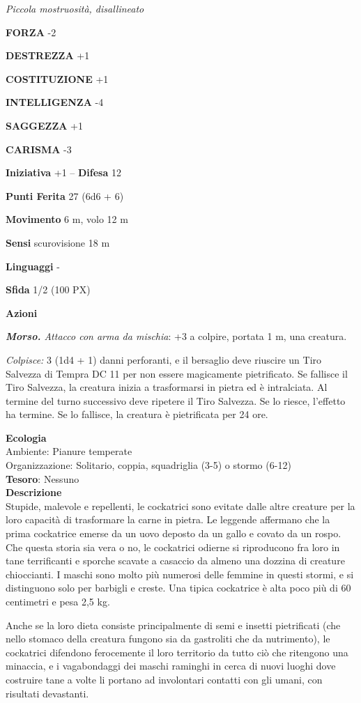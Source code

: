 \begin{multicols}{2}
\textit{Piccola mostruosità, disallineato}

\textbf{FORZA} -2

\textbf{DESTREZZA} +1

\textbf{COSTITUZIONE} +1

\textbf{INTELLIGENZA} -4

\textbf{SAGGEZZA} +1

\textbf{CARISMA} -3

\textbf{Iniziativa} +1 -- \textbf{Difesa} 12

\textbf{Punti Ferita} 27 (6d6 + 6)

\textbf{Movimento} 6 m, volo 12 m

\textbf{Sensi} scurovisione 18 m

\textbf{Linguaggi} -

\textbf{Sfida} 1/2 (100 PX)

\textbf{Azioni}

\textit{\textbf{Morso.} Attacco con arma da mischia}: +3 a colpire, portata 1 m, una creatura.

\textit{Colpisce:} 3 (1d4 + 1) danni perforanti, e il bersaglio deve riuscire un Tiro Salvezza di Tempra DC 11 per non essere magicamente pietrificato. Se fallisce il Tiro Salvezza, la creatura inizia a trasformarsi in pietra ed è intralciata. Al termine del turno successivo deve ripetere il Tiro Salvezza. Se lo riesce, l'effetto ha termine. Se lo fallisce, la creatura è pietrificata per 24 ore.

\textbf{Ecologia}\\
Ambiente: Pianure temperate\\
Organizzazione: Solitario, coppia, squadriglia (3-5) o stormo (6-12)\\
\textbf{Tesoro}: Nessuno\\
\textbf{Descrizione}\\
Stupide, malevole e repellenti, le cockatrici sono evitate dalle altre creature per la loro capacità di trasformare la carne in pietra. Le leggende affermano che la prima cockatrice emerse da un uovo deposto da un gallo e covato da un rospo. Che questa storia sia vera o no, le cockatrici odierne si riproducono fra loro in tane terrificanti e sporche scavate a casaccio da almeno una dozzina di creature chioccianti. I maschi sono molto più numerosi delle femmine in questi stormi, e si distinguono solo per barbigli e creste. Una tipica cockatrice è alta poco più di 60 centimetri e pesa 2,5 kg.

Anche se la loro dieta consiste principalmente di semi e insetti pietrificati (che nello stomaco della creatura fungono sia da gastroliti che da nutrimento), le cockatrici difendono ferocemente il loro territorio da tutto ciò che ritengono una minaccia, e i vagabondaggi dei maschi raminghi in cerca di nuovi luoghi dove costruire tane a volte li portano ad involontari contatti con gli umani, con risultati devastanti.


\end{multicols}

